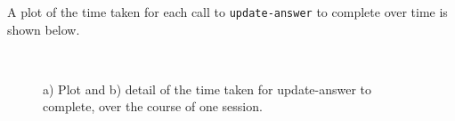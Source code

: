\documentclass[12pt,twoside,notitlepage,xetex]{report}
\begin{document}
A plot of the time taken for each call to \verb¬update-answer¬ to complete over time is shown below.

\begin{center}
\begin{figure}[H]
\begin{center}
\\
\end{center}
\caption{a) Plot and b) detail of the time taken for {\ttfamily update-answer} to complete, over the course of one session.}
\end{figure}
\end{center}
\end{document}
